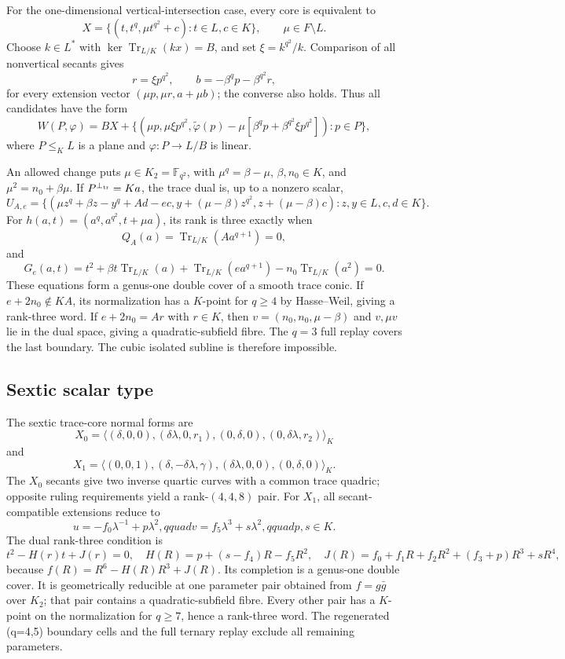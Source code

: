\documentclass[12pt,letterpaper,onecolumn]{article}
\theoremstyle{definition}
\theoremstyle{remark}
\begin{document}
For the one-dimensional vertical-intersection case, every core is equivalent
to
\[
X=\{(t,t^q,\mu t^{q^2}+c):t\in L, c\in K\},
\qquad \mu\in F\setminus L.
\]
Choose \(k\in L^*\) with
\(\ker\operatorname{Tr}_{L/K}(kx)=B\), and set \(\xi=k^{q^2}/k\).
Comparison of all nonvertical secants gives
\[
r=\xi p^{q^2},\qquad b=-\beta^qp-\beta^{q^2}r,
\tag{*}
\]
for every extension vector \((\mu p,\mu r,a+\mu b)\); the converse also
holds.  Thus all candidates have the form
\[
W(P,\varphi)=BX+\{(\mu p,\mu\xi p^{q^2},
\widetilde\varphi(p)-\mu[\beta^qp+\beta^{q^2}\xi p^{q^2}]):p\in P\},
\]
where \(P\le_KL\) is a plane and \(\varphi:P\to L/B\) is linear.

An allowed change puts \(\mu\in K_2=\mathbb F_{q^2}\), with
\(\mu^q=\beta-\mu\), \(\beta,n_0\in K\), and \(\mu^2=n_0+\beta\mu\).
If \(P^{\perp_{\rm tr}}=Ka\), the trace dual is, up to a nonzero scalar,
\[
U_{A,e}=\{(\mu z^q+\beta z-y^q+Ad-ec,
y+(\mu-\beta)z^{q^2},z+(\mu-\beta)c):z,y\in L, c,d\in K\}.
\]
For \(h(a,t)=(a^q,a^{q^2},t+\mu a)\), its rank is three exactly when
\[
Q_A(a)=\operatorname{Tr}_{L/K}(Aa^{q+1})=0,
\]
and
\[
G_e(a,t)=t^2+\beta t\operatorname{Tr}_{L/K}(a)
 +\operatorname{Tr}_{L/K}(ea^{q+1})-n_0\operatorname{Tr}_{L/K}(a^2)=0.
\]
These equations form a genus-one double cover of a smooth trace conic.
If \(e+2n_0\notin KA\), its normalization has a \(K\)-point for \(q\ge4\)
by Hasse--Weil, giving a rank-three word.  If \(e+2n_0=Ar\) with \(r\in K\),
then \(v=(n_0,n_0,\mu-\beta)\) and \(v,\mu v\) lie in the dual space,
giving a quadratic-subfield fibre.  The \(q=3\) full replay covers the last
boundary.  The cubic isolated subline is therefore impossible.

\subsection{Sextic scalar type}
The sextic trace-core normal forms are
\[
X_0=\langle(\delta,0,0),(\delta\lambda,0,r_1),
(0,\delta,0),(0,\delta\lambda,r_2)\rangle_K
\]
and
\[
X_1=\langle(0,0,1),(\delta,-\delta\lambda,\gamma),
(\delta\lambda,0,0),(0,\delta,0)\rangle_K.
\]
The \(X_0\) secants give two inverse quartic curves with a common trace
quadric; opposite ruling requirements yield a rank-\((4,4,8)\) pair.  For
\(X_1\), all secant-compatible extensions reduce to
\[
u=-f_0\lambda^{-1}+p\lambda^2,qquad
v=f_5\lambda^3+s\lambda^2,qquad p,s\in K.
\]
The dual rank-three condition is
\[
t^2-H(r)t+J(r)=0,
\quad H(R)=p+(s-f_4)R-f_5R^2,
\quad J(R)=f_0+f_1R+f_2R^2+(f_3+p)R^3+sR^4,
\]
because \(f(R)=R^6-H(R)R^3+J(R)\).  Its completion is a genus-one
double cover.  It is geometrically reducible at one parameter pair obtained
from \(f=g\bar g\) over \(K_2\); that pair contains a quadratic-subfield fibre.
Every other pair has a \(K\)-point on the normalization for \(q\ge7\), hence a
rank-three word.  The regenerated (q=4,5) boundary cells and the full
ternary replay exclude all remaining parameters.
\end{document}
